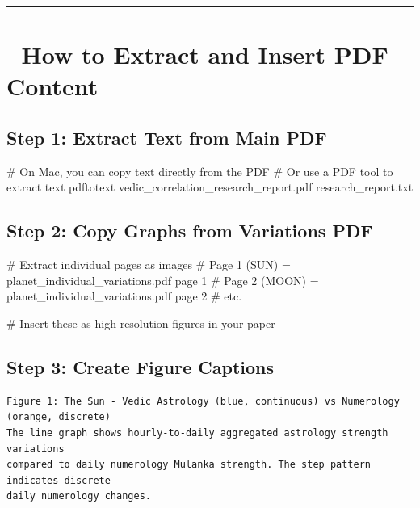 \documentclass[
  11pt,
  oneside,
  openany]{scrbook}
\newenvironment{Shaded}{\begin{snugshade}}{\end{snugshade}}
\newcommand{\CommentTok}[1]{\textcolor[rgb]{0.37,0.37,0.37}{#1}}
\newcommand{\ExtensionTok}[1]{\textcolor[rgb]{0.00,0.23,0.31}{#1}}
\newcommand{\NormalTok}[1]{\textcolor[rgb]{0.00,0.23,0.31}{#1}}
\begin{document}
\begin{center}\rule{0.5\linewidth}{0.5pt}\end{center}

\section{🎨 How to Extract and Insert PDF
Content}\label{how-to-extract-and-insert-pdf-content}

\subsection{Step 1: Extract Text from Main
PDF}\label{step-1-extract-text-from-main-pdf}

\begin{Shaded}
\begin{Highlighting}[]
\CommentTok{\# On Mac, you can copy text directly from the PDF}
\CommentTok{\# Or use a PDF tool to extract text}
\ExtensionTok{pdftotext}\NormalTok{ vedic\_correlation\_research\_report.pdf research\_report.txt}
\end{Highlighting}
\end{Shaded}

\subsection{Step 2: Copy Graphs from Variations
PDF}\label{step-2-copy-graphs-from-variations-pdf}

\begin{Shaded}
\begin{Highlighting}[]
\CommentTok{\# Extract individual pages as images}
\CommentTok{\# Page 1 (SUN) = planet\_individual\_variations.pdf page 1}
\CommentTok{\# Page 2 (MOON) = planet\_individual\_variations.pdf page 2}
\CommentTok{\# etc.}

\CommentTok{\# Insert these as high{-}resolution figures in your paper}
\end{Highlighting}
\end{Shaded}

\subsection{Step 3: Create Figure
Captions}\label{step-3-create-figure-captions}

\begin{verbatim}
Figure 1: The Sun - Vedic Astrology (blue, continuous) vs Numerology (orange, discrete)
The line graph shows hourly-to-daily aggregated astrology strength variations
compared to daily numerology Mulanka strength. The step pattern indicates discrete
daily numerology changes.
\end{verbatim}
\end{document}
